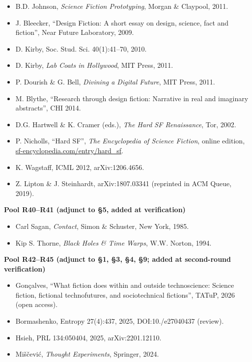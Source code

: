 \documentclass[11pt,a4paper]{article}
\begin{document}
\begin{itemize}[leftmargin=1.6em,itemsep=2pt,parsep=0pt,topsep=3pt]
\item[R30.] B.D. Johnson, \textit{Science Fiction Prototyping}, Morgan \& Claypool, 2011.
\item[R31.] J. Bleecker, ``Design Fiction: A short essay on design, science, fact and fiction'', Near Future Laboratory, 2009.
\item[R32.] D. Kirby, Soc. Stud. Sci. 40(1):41–70, 2010.
\item[R33.] D. Kirby, \textit{Lab Coats in Hollywood}, MIT Press, 2011.
\item[R34.] P. Dourish \& G. Bell, \textit{Divining a Digital Future}, MIT Press, 2011.
\item[R35.] M. Blythe, ``Research through design fiction: Narrative in real and imaginary abstracts'', CHI 2014.
\item[R36.] D.G. Hartwell \& K. Cramer (eds.), \textit{The Hard SF Renaissance}, Tor, 2002.
\item[R37.] P. Nicholls, ``Hard SF'', \textit{The Encyclopedia of Science Fiction}, online edition, \url{sf-encyclopedia.com/entry/hard_sf}.
\item[R38.] K. Wagstaff, ICML 2012, arXiv:1206.4656.
\item[R39.] Z. Lipton \& J. Steinhardt, arXiv:1807.03341 (reprinted in ACM Queue, 2019).
\end{itemize}

\medskip
\noindent\textbf{Pool R40–R41 (adjunct to §5, added at verification)}\par\addvspace{2pt}

\begin{itemize}[leftmargin=1.6em,itemsep=2pt,parsep=0pt,topsep=3pt]
\item[R40.] Carl Sagan, \textit{Contact}, Simon \& Schuster, New York, 1985.
\item[R41.] Kip S. Thorne, \textit{Black Holes \& Time Warps}, W.W. Norton, 1994.
\end{itemize}

\medskip
\noindent\textbf{Pool R42–R45 (adjunct to §1, §3, §4, §9; added at second-round verification)}\par\addvspace{2pt}

\begin{itemize}[leftmargin=1.6em,itemsep=2pt,parsep=0pt,topsep=3pt]
\item[R42.] Gonçalves, ``What fiction does within and outside technoscience: Science fiction, fictional technofutures, and sociotechnical fictions'', TATuP, 2026 (open access).
\item[R43.] Bormashenko, Entropy 27(4):437, 2025, DOI:10./\allowbreak e27040437 (review).
\item[R44.] Hsieh, PRL 134:050404, 2025, arXiv:2201.12110.
\item[R45.] Miščević, \textit{Thought Experiments}, Springer, 2024.
\end{itemize}
\end{document}
